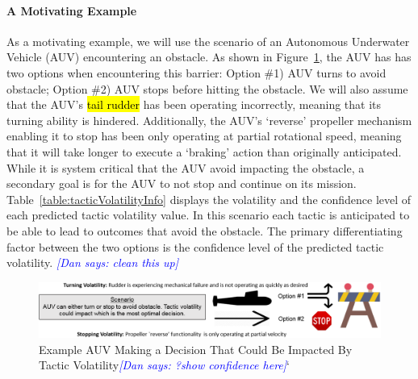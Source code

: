 \documentclass[12pt]{article}
\newcommand{\dan}[1]{\textcolor{blue}{{\it [Dan says: #1]}}}
\begin{document}
\vspace{-3mm}\paragraph{A Motivating Example} 
As a motivating example, we will use the scenario of an Autonomous Underwater Vehicle (AUV) encountering an obstacle. As shown in Figure~\ref{fig:AUVObstacleExample}, the AUV has has two options when encountering this barrier: Option \#1) AUV turns to avoid obstacle; Option \#2) AUV stops before hitting the obstacle. We will also assume that the AUV's \hl{tail rudder} has been operating incorrectly, meaning that its turning ability is hindered. Additionally, the AUV's `reverse' propeller mechanism enabling it to stop has been only operating at partial rotational speed, meaning that it will take longer to execute a `braking' action than originally anticipated. While it is system critical that the AUV avoid impacting the obstacle, a secondary goal is for the AUV to not stop and continue on its mission. Table~\ref{table:tacticVolatilityInfo} displays the volatility and the confidence level of each predicted tactic volatility value. In this scenario each tactic is anticipated to be able to lead to outcomes that avoid the obstacle. The primary differentiating factor between the two options is the confidence level of the predicted tactic volatility. \dan{clean this up}






\begin{figure}[h]
	\centering
    \includegraphics[scale=0.55]{images/AUVObstacle2.png}
    \caption{Example AUV Making a Decision That Could Be Impacted By Tactic Volatility\dan{?show confidence here}`}
    \label{fig:AUVObstacleExample}
\end{figure}
\end{document}
